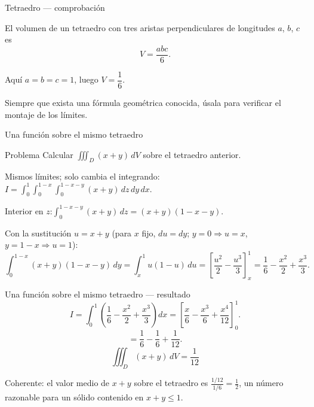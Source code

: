 \documentclass[11pt,aspectratio=169]{beamer}
\begin{document}
\begin{frame}{Tetraedro --- comprobación}
  \begin{center}
  \normalsize
  El volumen de un tetraedro con tres aristas perpendiculares de longitudes $a$, $b$, $c$ es
  \[
    V = \frac{abc}{6}.
  \]
  \end{center}
  \pause
  \vspace{6pt}
  \begin{center}
  Aquí $a=b=c=1$, luego $V=\dfrac16$. \quad\checkmark
  \end{center}
  \pause
  \vspace{10pt}
  \begin{center}\small\color{gray60}
  Siempre que exista una fórmula geométrica conocida, úsala para verificar el montaje de los límites.
  \end{center}
\end{frame}

\begin{frame}{Una función sobre el mismo tetraedro}
  \begin{block}{Problema}
    Calcular $\displaystyle\iiint_D (x+y)\,dV$ sobre el tetraedro anterior.
  \end{block}
  \pause
  Mismos límites; solo cambia el integrando:
  $\displaystyle I=\int_0^1\!\!\int_0^{1-x}\!\!\int_0^{1-x-y} (x+y)\,dz\,dy\,dx$.
  \pause
  \vspace{4pt}

  Interior en $z$:\quad $\displaystyle\int_0^{1-x-y}(x+y)\,dz = (x+y)(1-x-y)$.
  \pause
  \vspace{4pt}

  Con la sustitución $u=x+y$ (para $x$ fijo, $du=dy$; $y=0\Rightarrow u=x$, $y=1-x\Rightarrow u=1$):
  \[
    \int_0^{1-x}(x+y)(1-x-y)\,dy = \int_x^1 u(1-u)\,du
    = \left[\frac{u^2}{2}-\frac{u^3}{3}\right]_x^1
    = \frac16-\frac{x^2}{2}+\frac{x^3}{3}.
  \]
\end{frame}

\begin{frame}{Una función sobre el mismo tetraedro --- resultado}
  \[
    I=\int_0^1\left(\frac16-\frac{x^2}{2}+\frac{x^3}{3}\right)dx
    = \left[\frac{x}{6}-\frac{x^3}{6}+\frac{x^4}{12}\right]_0^1.
  \]
  \pause
  \[
    = \frac16-\frac16+\frac{1}{12}.
  \]
  \pause
  \[
    \boxed{\iiint_D (x+y)\,dV = \frac{1}{12}}
  \]
  \pause
  \vspace{6pt}
  \begin{center}\small\color{gray60}
  Coherente: el valor medio de $x+y$ sobre el tetraedro es $\frac{1/12}{1/6}=\frac12$, un número razonable para un sólido contenido en $x+y\le1$.
  \end{center}
\end{frame}
\end{document}
